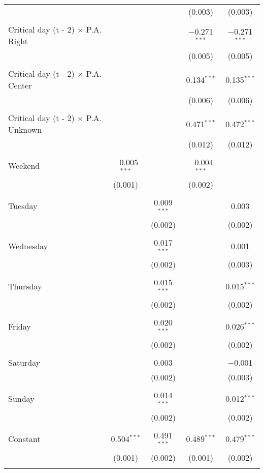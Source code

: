 \documentclass[
]{article}
\begin{document}
\begin{table}[!htbp]
{\begin{tabular}{@{\extracolsep{5pt}}lcccc}
  &  &  & (0.003) & (0.003) \\ 
  & & & & \\ 
 Critical day (t - 2) $\times$ P.A. Right &  &  & $-$0.271$^{***}$ & $-$0.271$^{***}$ \\ 
  &  &  & (0.005) & (0.005) \\ 
  & & & & \\ 
 Critical day (t - 2) $\times$ P.A. Center &  &  & 0.134$^{***}$ & 0.135$^{***}$ \\ 
  &  &  & (0.006) & (0.006) \\ 
  & & & & \\ 
 Critical day (t - 2) $\times$ P.A. Unknown &  &  & 0.471$^{***}$ & 0.472$^{***}$ \\ 
  &  &  & (0.012) & (0.012) \\ 
  & & & & \\ 
 Weekend & $-$0.005$^{***}$ &  & $-$0.004$^{***}$ &  \\ 
  & (0.001) &  & (0.002) &  \\ 
  & & & & \\ 
 Tuesday &  & 0.009$^{***}$ &  & 0.003 \\ 
  &  & (0.002) &  & (0.002) \\ 
  & & & & \\ 
 Wednesday &  & 0.017$^{***}$ &  & 0.001 \\ 
  &  & (0.002) &  & (0.003) \\ 
  & & & & \\ 
 Thursday &  & 0.015$^{***}$ &  & 0.015$^{***}$ \\ 
  &  & (0.002) &  & (0.002) \\ 
  & & & & \\ 
 Friday &  & 0.020$^{***}$ &  & 0.026$^{***}$ \\ 
  &  & (0.002) &  & (0.002) \\ 
  & & & & \\ 
 Saturday &  & 0.003 &  & $-$0.001 \\ 
  &  & (0.002) &  & (0.003) \\ 
  & & & & \\ 
 Sunday &  & 0.014$^{***}$ &  & 0.012$^{***}$ \\ 
  &  & (0.002) &  & (0.002) \\ 
  & & & & \\ 
 Constant & 0.504$^{***}$ & 0.491$^{***}$ & 0.489$^{***}$ & 0.479$^{***}$ \\ 
  & (0.001) & (0.002) & (0.001) & (0.002) \\ 
  & & & & \\ 

\end{tabular}}
\end{table}
\end{document}
